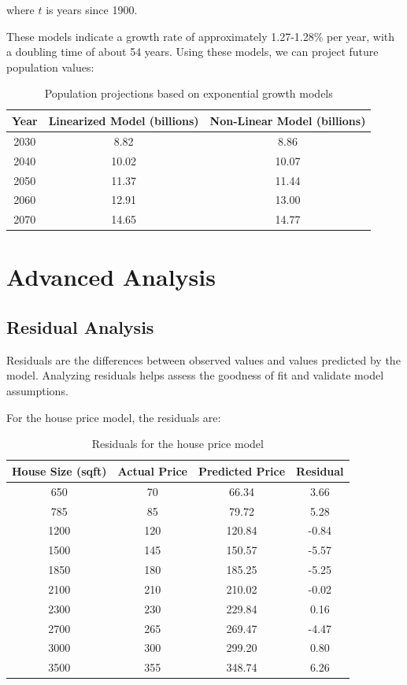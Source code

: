 \documentclass[12pt]{article}
\begin{document}
where $t$ is years since 1900.

These models indicate a growth rate of approximately 1.27-1.28\% per year, with a doubling time of about 54 years. Using these models, we can project future population values:

\begin{table}[H]
\centering
\begin{tabular}{ccc}
\toprule
Year & Linearized Model (billions) & Non-Linear Model (billions) \\
\midrule
2030 & 8.82 & 8.86 \\
2040 & 10.02 & 10.07 \\
2050 & 11.37 & 11.44 \\
2060 & 12.91 & 13.00 \\
2070 & 14.65 & 14.77 \\
\bottomrule
\end{tabular}
\caption{Population projections based on exponential growth models}
\label{tab:population_projections}
\end{table}

\section{Advanced Analysis}

\subsection{Residual Analysis}

Residuals are the differences between observed values and values predicted by the model. Analyzing residuals helps assess the goodness of fit and validate model assumptions.

For the house price model, the residuals are:

\begin{table}[H]
\centering
\begin{tabular}{cccc}
\toprule
House Size (sqft) & Actual Price & Predicted Price & Residual \\
\midrule
650 & 70 & 66.34 & 3.66 \\
785 & 85 & 79.72 & 5.28 \\
1200 & 120 & 120.84 & -0.84 \\
1500 & 145 & 150.57 & -5.57 \\
1850 & 180 & 185.25 & -5.25 \\
2100 & 210 & 210.02 & -0.02 \\
2300 & 230 & 229.84 & 0.16 \\
2700 & 265 & 269.47 & -4.47 \\
3000 & 300 & 299.20 & 0.80 \\
3500 & 355 & 348.74 & 6.26 \\
\bottomrule
\end{tabular}
\caption{Residuals for the house price model}
\label{tab:residuals}
\end{table}
\end{document}
